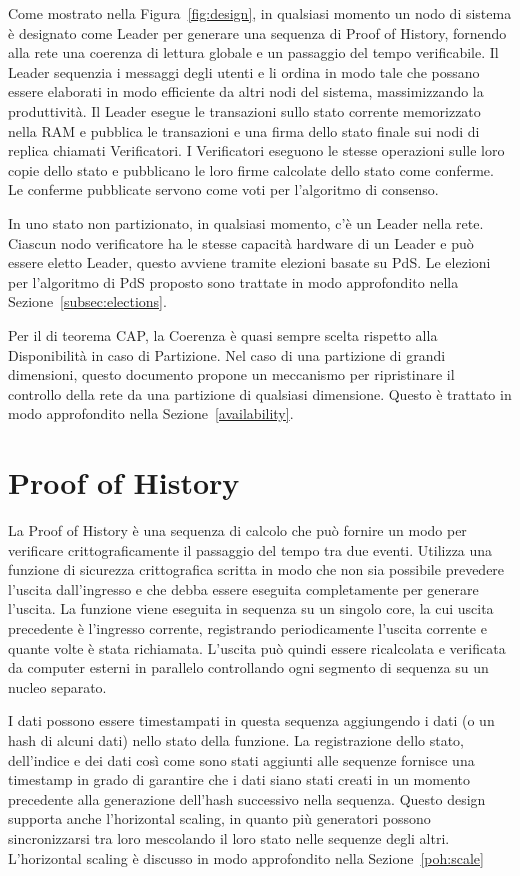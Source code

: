 \documentclass[12pt]{article}
\begin{document}
Come mostrato nella Figura~\ref{fig:design}, in qualsiasi momento un nodo di sistema è designato come Leader per generare una sequenza di Proof of History, fornendo alla rete una coerenza di lettura globale e un passaggio del tempo verificabile. Il Leader sequenzia i messaggi degli utenti e li ordina in modo tale che possano essere elaborati in modo efficiente da altri nodi del sistema, massimizzando la produttività. Il Leader esegue le transazioni sullo stato corrente memorizzato nella RAM e pubblica le transazioni e una firma dello stato finale sui nodi di replica chiamati Verificatori. I Verificatori eseguono le stesse operazioni sulle loro copie dello stato e pubblicano le loro firme calcolate dello stato come conferme. Le conferme pubblicate servono come voti per l'algoritmo di consenso.

In uno stato non partizionato, in qualsiasi momento, c'è un Leader nella rete. Ciascun nodo verificatore ha le stesse capacità hardware di un Leader e può essere eletto Leader, questo avviene tramite elezioni basate su PdS. Le elezioni per l'algoritmo di PdS proposto sono trattate in modo approfondito nella Sezione~\ref{subsec:elections}.

Per il di teorema CAP, la Coerenza è quasi sempre scelta rispetto alla Disponibilità in caso di Partizione. Nel caso di una partizione di grandi dimensioni, questo documento propone un meccanismo per ripristinare il controllo della rete da una partizione di qualsiasi dimensione. Questo è trattato in modo approfondito nella Sezione~\ref{availability}.	

\section{Proof of History}\label{proof_of_history}

La Proof of History è una sequenza di calcolo che può fornire un modo per verificare crittograficamente il passaggio del tempo tra due eventi. Utilizza una funzione di sicurezza crittografica scritta in modo che non sia possibile prevedere l'uscita dall'ingresso e che debba essere eseguita completamente per generare l'uscita. La funzione viene eseguita in sequenza su un singolo core, la cui uscita precedente è l'ingresso corrente, registrando periodicamente l'uscita corrente e quante volte è stata richiamata. L'uscita può quindi essere ricalcolata e verificata da computer esterni in parallelo controllando ogni segmento di sequenza su un nucleo separato.

I dati possono essere timestampati in questa sequenza aggiungendo i dati (o un hash di alcuni dati) nello stato della funzione. La registrazione dello stato, dell'indice e dei dati così come sono stati aggiunti alle sequenze fornisce una timestamp in grado di garantire che i dati siano stati creati in un momento precedente alla generazione dell'hash successivo nella sequenza. Questo design supporta anche l'horizontal scaling, in quanto più generatori possono sincronizzarsi tra loro mescolando il loro stato nelle sequenze degli altri. L'horizontal scaling è discusso in modo approfondito nella Sezione~\ref{poh:scale}\\
\end{document}
